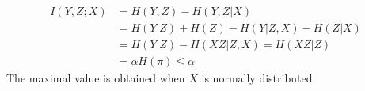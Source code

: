 \begin{exercise}
\begin{solution}
\begin{enumerate}
{    \begin{equation}
      \begin{aligned}
        I(Y,Z;X) &= H(Y,Z) - H(Y,Z|X) \\
        &= H(Y|Z) + H(Z) - H(Y|Z,X) - H(Z|X) \\
        &= H(Y|Z) - H(XZ|Z,X) = H(XZ|Z) \\
        &= \alpha H(\pi) \le \alpha
       \end{aligned}
    \end{equation}
    The maximal value is obtained when $X$ is normally distributed.
    }
  \end{enumerate}
  \end{solution}
  \label{ex7-3}
\end{exercise}

